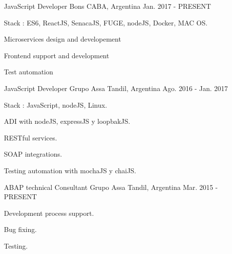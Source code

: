 


\begin{cventries}

\cventry
{ JavaScript Developer} %
{Bons} %
{CABA, Argentina} %
{Jan. 2017 - PRESENT} %
{ %
\begin{cvitems}
\item {Stack : ES6, ReactJS, SenacaJS, FUGE, nodeJS, Docker, MAC OS.}
\item {Microservices design and developement}
\item {Frontend support and development}
\item {Test automation}
\end{cvitems}
}
\cventry
{ JavaScript Developer} %
{Grupo Assa} %
{Tandil, Argentina} %
{Ago. 2016 - Jan. 2017} %
{ %
\begin{cvitems}
\item {Stack : JavaScript, nodeJS, Linux.}
\item {ADI with nodeJS, expressJS y loopbakJS.}
\item {RESTful services.}
\item {SOAP integrations.}
\item {Testing automation with mochaJS y chaiJS.}
\end{cvitems}
}

\cventry
{ABAP technical Consultant} %
{Grupo Assa} %
{Tandil, Argentina} %
{Mar. 2015 - PRESENT} %
{ %
\begin{cvitems}
\item {Development process support.}
\item {Bug fixing.}
\item {Testing.}
\end{cvitems}
}



\end{cventries}
